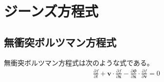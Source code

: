 \begin{comment}
ハミルトニアンとは、物体の持つ力学的エネルギーを、位相空間で表現したものである。位相空間とは、運動量と位置で張られる空間である。力学的エネルギー保存の法則より、ハミルトニアンは時間によらず一定である。この性質を利用して、うまく事後確率のサンプルを得る。慣性付きの勾配法のようなものである。このアルゴリズムは次のようになる。
\begin{enumerate}
	\item{運動量$p$を標準正規乱数から発生させる。}
	\item{ポテンシャル$h(\theta)$を対数事後分布として、慣性付きの勾配法を進めて、$L$ステップ後 の値を$\theta_a$とする。}
	\item{$r=exp(H(\theta_t,p_t)−H(\theta_a,p_a))$を求める。}
	\item{確率${\rm min}(1, r)$でパラメータ$\theta_a$を受容する。}
\end{enumerate}
ここで、$H$はハミルトニアンで、$H(\theta,p) = h(\theta) + 1p\cdot p$である。
\end{comment}


\section{ジーンズ方程式}
\subsection{無衝突ボルツマン方程式}
無衝突ボルツマン方程式は次のような式である。
\begin{align}
	\frac{\partial f}{\partial t} + \bm{v} \cdot \frac{\partial f}{\partial \bm{x}} - \frac{\partial \Phi}{\partial \bm{x}} \cdot \frac{\partial f}{\partial \bm{v}} = 0 \label{CBE}
\end{align}


